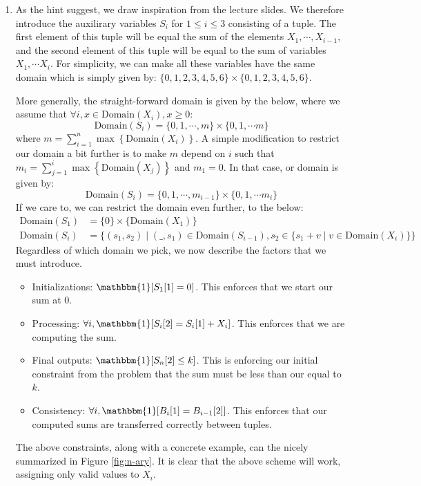 \documentclass[12pt]{article}
\begin{document}
\begin{enumerate}[label=(\alph*)]
  \item As the hint suggest, we draw inspiration from the lecture slides. We therefore introduce the auxilirary variables $S_i$ for $1 \leq i \leq 3$ consisting of a tuple. The first element of this tuple will be equal the sum  of the elements $X_1, \cdots, X_{i-1}$, and the second element of this tuple will be equal to the sum of variables $X_1, \cdots X_{i}$. For simplicity, we can make all these variables have the same domain which is simply given by: $\{0,1,2,3,4,5,6 \} \times \{0,1,2,3,4,5,6 \}$.

  More generally, the straight-forward domain is given by the below, where we assume that $\forall i, x \in \text{Domain}(X_i), x \geq 0$:
  $$
    \text{Domain}(S_i) = \{0,1, \cdots, m \} \times \{ 0,1,\cdots m \}
  $$
  where $m = \sum_{i=1}^n \max\left\{ \text{Domain}(X_i) \right\}$. A simple modification to restrict our domain a bit further is to make $m$ depend on $i$ such that $m_i = \sum_{j=1}^{i} \max\left\{ \text{Domain}(X_j) \right\}$ and $m_1 = 0$. In that case, or domain is given by:
  $$
    \text{Domain}(S_i) = \{0,1,\cdots, m_{i-1} \} \times \{0, 1, \cdots m_i \}
  $$
  If we care to, we can restrict the domain even further, to the below:
  \begin{align*}
   \text{Domain}(S_1) &= \{0 \} \times \{\text{Domain}(X_1) \} \\
   \text{Domain}(S_i) &=  \{ (s_1,s_2) \mid (\_, s_1) \in \text{Domain}(S_{i-1}), s_2 \in \{ s_1 + v \mid v \in \text{Domain}(X_i) \} \}
  \end{align*}
  Regardless of which domain we pick, we now describe the factors that we must introduce.
  \begin{itemize}
    \item Initializations: $\mathbbm{1}[S_1[1] = 0]$. This enforces that we start our sum at $0$.
    \item Processing: $\forall i, \mathbbm{1}[S_i[2] = S_i[1] + X_i]$. This enforces that we are computing the sum.
    \item Final outputs: $\mathbbm{1}[S_n[2] \leq k]$. This is enforcing our initial constraint from the problem that the sum must be less than our equal to $k$.
    \item Consistency: $\forall i, \mathbbm{1}[B_{i}[1] = B_{i-1}[2]]$. This enforces that our computed sums are transferred correctly between tuples.
  \end{itemize}
  The above constraints, along with a concrete example, can the nicely summarized in Figure \ref{fig:n-ary}. It is clear that the above scheme will work, assigning only valid values to $X_i$.

\end{enumerate}
\end{document}
